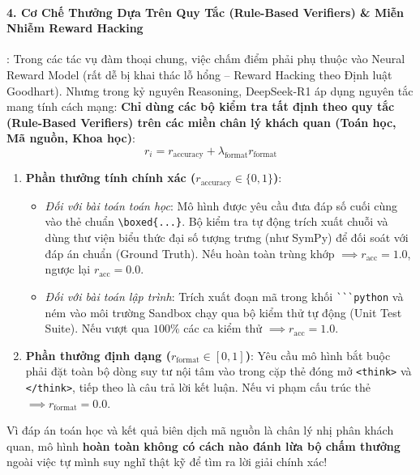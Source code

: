 \paragraph{4. Cơ Chế Thưởng Dựa Trên Quy Tắc (Rule-Based Verifiers) \& Miễn Nhiễm Reward Hacking}:
Trong các tác vụ đàm thoại chung, việc chấm điểm phải phụ thuộc vào Neural Reward Model (rất dễ bị khai thác lỗ hổng -- Reward Hacking theo Định luật Goodhart). Nhưng trong kỷ nguyên Reasoning, DeepSeek-R1 áp dụng nguyên tắc mang tính cách mạng: \textbf{Chỉ dùng các bộ kiểm tra tất định theo quy tắc (Rule-Based Verifiers) trên các miền chân lý khách quan (Toán học, Mã nguồn, Khoa học)}:
\begin{equation}
r_i = r_{\text{accuracy}} + \lambda_{\text{format}} r_{\text{format}}
\end{equation}
\begin{enumerate}
  \item \textbf{Phần thưởng tính chính xác ($r_{\text{accuracy}} \in \{0, 1\}$)}:
  \begin{itemize}
    \item \textit{Đối với bài toán toán học}: Mô hình được yêu cầu đưa đáp số cuối cùng vào thẻ chuẩn \verb|\boxed{...}|. Bộ kiểm tra tự động trích xuất chuỗi và dùng thư viện biểu thức đại số tượng trưng (như SymPy) để đối soát với đáp án chuẩn (Ground Truth). Nếu hoàn toàn trùng khớp $\implies r_{\text{acc}} = 1.0$, ngược lại $r_{\text{acc}} = 0.0$.
    \item \textit{Đối với bài toán lập trình}: Trích xuất đoạn mã trong khối \verb|```python| và ném vào môi trường Sandbox chạy qua bộ kiểm thử tự động (Unit Test Suite). Nếu vượt qua $100\%$ các ca kiểm thử $\implies r_{\text{acc}} = 1.0$.
  \end{itemize}
  \item \textbf{Phần thưởng định dạng ($r_{\text{format}} \in [0, 1]$)}:
  Yêu cầu mô hình bắt buộc phải đặt toàn bộ dòng suy tư nội tâm vào trong cặp thẻ đóng mở \verb|<think>| và \verb|</think>|, tiếp theo là câu trả lời kết luận. Nếu vi phạm cấu trúc thẻ $\implies r_{\text{format}} = 0.0$.
\end{enumerate}
Vì đáp án toán học và kết quả biên dịch mã nguồn là chân lý nhị phân khách quan, mô hình \textbf{hoàn toàn không có cách nào đánh lừa bộ chấm thưởng} ngoài việc tự mình suy nghĩ thật kỹ để tìm ra lời giải chính xác!


